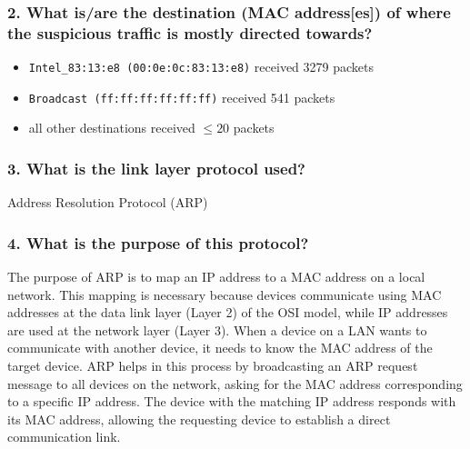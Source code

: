 \subsubsection*{2. What is/are the destination (MAC address[es]) of where the suspicious traffic is mostly directed towards?}
\begin{itemize}
	\item \texttt{Intel\_83:13:e8 (00:0e:0c:83:13:e8)} received 3279 packets
	\item \texttt{Broadcast (ff:ff:ff:ff:ff:ff)} received 541 packets
	\item all other destinations received $\leq 20$ packets
\end{itemize}
\subsubsection*{3. What is the link layer protocol used?}
Address Resolution Protocol (ARP)
\subsubsection*{4. What is the purpose of this protocol?}
The purpose of ARP  is to map an IP address to a MAC address on a local network. This mapping is necessary because devices communicate using MAC addresses at the data link layer (Layer 2) of the OSI model, while IP addresses are used at the network layer (Layer 3). When a device on a LAN wants to communicate with another device, it needs to know the MAC address of the target device. ARP helps in this process by broadcasting an ARP request message to all devices on the network, asking for the MAC address corresponding to a specific IP address. The device with the matching IP address responds with its MAC address, allowing the requesting device to establish a direct communication link.\cite{rfc826}
